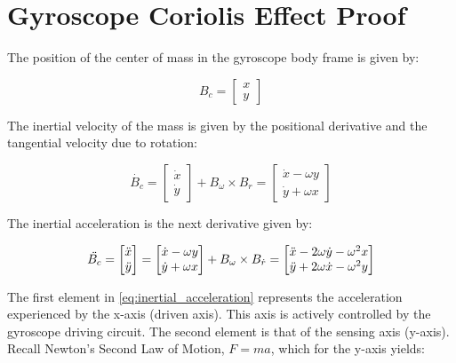\chapter{Gyroscope Coriolis Effect Proof} 

The position of the center of mass in the gyroscope body  frame is given by:

\begin{equation}
    B_c = 
    \begin{bmatrix}
        x \\
        y 
    \end{bmatrix}
\end{equation}

The inertial velocity of the mass is given by the positional derivative and the tangential velocity due to rotation:

\begin{equation}
    \dot{B_c} = 
    \begin{bmatrix}
        \dot{x} \\ 
        \dot{y}
    \end{bmatrix}
    + B_\omega \times B_r =
    \begin{bmatrix}
        \dot{x} - \omega y \\
        \dot{y} + \omega x
    \end{bmatrix}
\end{equation}

The inertial acceleration is the next derivative given by:

\begin{equation} \labeq{inertial_acceleration}
    \ddot{B_c} = 
    \begin{bmatrix}
        \ddot{x} \\
        \ddot{y}
    \end{bmatrix} = 
    \begin{bmatrix}
        \dot{x}-\omega y \\
        \dot{y} + \omega x
    \end{bmatrix}
    + B_\omega \times B_{\dot{r}} = 
    \begin{bmatrix}
        \ddot{x} - 2\omega\dot{y} - \omega^2 x \\
        \ddot{y} + 2\omega\dot{x} - \omega^2 y
    \end{bmatrix}
\end{equation}

The first element in \ref{eq:inertial_acceleration} represents the acceleration experienced by the x-axis (driven axis). This axis is actively controlled by the gyroscope driving circuit. The second element is that of the sensing axis (y-axis). Recall Newton’s Second Law of Motion, $F=ma$, which for the y-axis yields:

